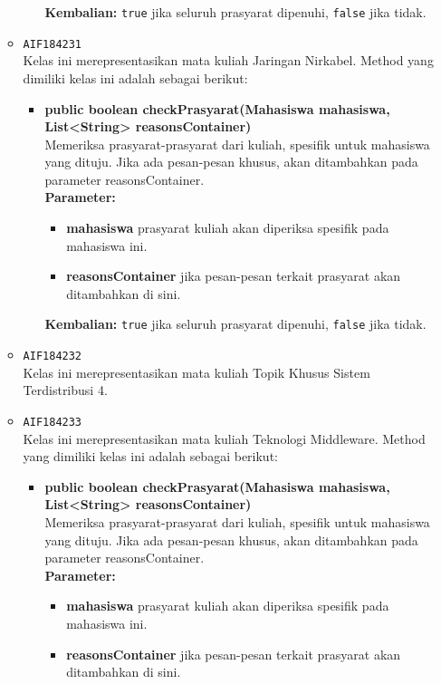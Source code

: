 \begin{enumerate}
\begin{itemize}
\begin{itemize}
\begin{itemize}
\end{itemize}
\textbf{Kembalian:} \texttt{true} jika seluruh prasyarat dipenuhi, \texttt{false} jika tidak.
\end{itemize}
\item \texttt{AIF184231} \\
Kelas ini merepresentasikan mata kuliah Jaringan Nirkabel. Method yang dimiliki kelas ini adalah sebagai berikut: 
\begin{itemize}
\item \textbf{public boolean checkPrasyarat(Mahasiswa mahasiswa, List<String> reasonsContainer)}\\
Memeriksa prasyarat-prasyarat dari kuliah, spesifik untuk mahasiswa yang dituju. Jika ada pesan-pesan khusus, akan ditambahkan pada parameter reasonsContainer.\\
\textbf{Parameter:}
\begin{itemize}
\item \textbf{mahasiswa} prasyarat kuliah akan diperiksa spesifik pada mahasiswa ini.
\item \textbf{reasonsContainer} jika pesan-pesan terkait prasyarat akan ditambahkan di sini.
\end{itemize}
\textbf{Kembalian:} \texttt{true} jika seluruh prasyarat dipenuhi, \texttt{false} jika tidak.
\end{itemize}
\item \texttt{AIF184232} \\
Kelas ini merepresentasikan mata kuliah Topik Khusus Sistem Terdistribusi 4.
\item \texttt{AIF184233} \\
Kelas ini merepresentasikan mata kuliah Teknologi Middleware. Method yang dimiliki kelas ini adalah sebagai berikut: 
\begin{itemize}
\item \textbf{public boolean checkPrasyarat(Mahasiswa mahasiswa, List<String> reasonsContainer)}\\
Memeriksa prasyarat-prasyarat dari kuliah, spesifik untuk mahasiswa yang dituju. Jika ada pesan-pesan khusus, akan ditambahkan pada parameter reasonsContainer.\\
\textbf{Parameter:}
\begin{itemize}
\item \textbf{mahasiswa} prasyarat kuliah akan diperiksa spesifik pada mahasiswa ini.
\item \textbf{reasonsContainer} jika pesan-pesan terkait prasyarat akan ditambahkan di sini.
\end{itemize}

\end{itemize}
\end{itemize}
\end{enumerate}
